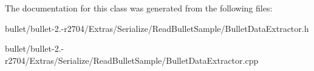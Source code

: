 The documentation for this class was generated from the following files\+:\begin{DoxyCompactItemize}
\item 
bullet/bullet-\/2.-\/r2704/\+Extras/\+Serialize/\+Read\+Bullet\+Sample/Bullet\+Data\+Extractor.\+h\item 
bullet/bullet-\/2.-\/r2704/\+Extras/\+Serialize/\+Read\+Bullet\+Sample/Bullet\+Data\+Extractor.\+cpp\end{DoxyCompactItemize}
